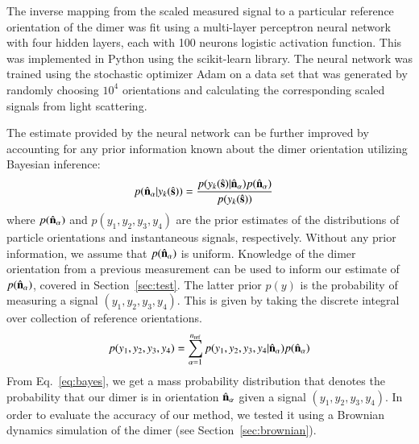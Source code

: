 \documentclass[final,  3p]{elsarticle}
\begin{document}


The inverse mapping from the scaled measured signal to a particular
reference orientation of the dimer was fit using a multi-layer
perceptron neural network with four hidden layers, each with 100
neurons logistic activation function.  This was implemented in Python
using the scikit-learn \cite{Pedregosa_etal_2011} library.
The neural network was trained using the stochastic optimizer Adam
\cite{Kingma_Ba_014} on a data set that was generated by randomly
choosing $10^4$ orientations and calculating the corresponding scaled
signals from light scattering.
%
%


The estimate provided by the neural network can be further improved by
accounting for any prior information known about the dimer orientation
utilizing Bayesian inference:
\begin{align}
  \label{eq:bayes}
  p(\hat{\bf n}_\alpha| y_k(\hat{\bf s}))
  &=
    \frac{p(y_k(\hat{\bf s})|\hat{\bf n}_\alpha)
    p(\hat{\bf n}_\alpha)}{p(y_k(\hat{\bf s}))}
\end{align}
where $p(\hat{\bf n}_\alpha)$ and $p(y_1, y_2, y_3, y_4)$ are the
prior estimates of the distributions of particle orientations and
instantaneous signals, respectively.
%
Without any prior information, we assume that
$p(\hat{\bf n}_{\alpha})$ is uniform.  Knowledge of the dimer
orientation from a previous measurement can be used to inform our
estimate of $p(\hat{\bf n}_{\alpha})$, covered in
Section~\ref{sec:test}.  The latter prior $p(y)$ is the probability of
measuring a signal $(y_1, y_2, y_3, y_4)$.  This is given by taking
the discrete integral over collection of reference orientations.
\begin{align}
  p(y_1, y_2, y_3, y_4)
  =
  \sum_{\alpha=1}^{n_{\rm ref}}
  p(y_1, y_2, y_3, y_4|\hat{\bf n}_\alpha)
  p(\hat{\bf n}_\alpha)
\end{align}
From Eq.~\eqref{eq:bayes}, we get a mass probability distribution that
denotes the probability that our dimer is in orientation
$\hat{\bf n}_{\alpha}$ given a signal $(y_1, y_2, y_3, y_4)$.  In
order to evaluate the accuracy of our method, we tested it using a
Brownian dynamics simulation of the dimer (see
Section~\ref{sec:brownian}).
\end{document}
